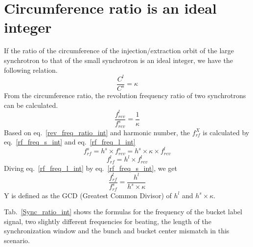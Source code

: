 %
%
% 
%
\section{ Circumference ratio is an ideal integer}

If the ratio of the circumference of the injection/extraction orbit of the large synchrotron to that of the small synchrotron is an ideal integer, we have the following relation. 
\begin{equation}
\frac{C^l}{C^s}=\kappa \label{circumference_ratio_int}
\end{equation}
From the circumference ratio, the revolution frequency ratio of two synchrotrons can be calculated.
\begin{equation}
\frac{f_{rev}^{l}}{f_{rev}^{s}}=\frac{1}{\kappa} \label{rev_freq_ratio_int}
\end{equation}
Based on eq.~\ref{rev_freq_ratio_int} and harmonic number, the $f_{rf}^{X}$ is calculated by eq.~\ref{rf_freq_s_int} and eq.~\ref{rf_freq_l_int}
\begin{equation} 
f_{rf}^{s}= h^s \times f_{rev}^{s}=h^s \times \kappa \times f_{rev}^{l} \label{rf_freq_s_int}
\end{equation}
\begin{equation} 
f_{rf}^{l}= h^l \times f_{rev}^{l} \label{rf_freq_l_int}
\end{equation}
Diving eq.~\ref{rf_freq_l_int} by eq.~\ref{rf_freq_s_int}, we get
\begin{equation} 
\frac{f_{rf}^{l}}{f_{rf}^{s}}= \frac{h^l}{h^s \times \kappa} \label{rf_freq_ratio}
\end{equation}
Y is defined as the \gls{GCD} (Greatest Common Divisor) of $h^l$ and $h^s \times \kappa$.

Tab.~\ref{Sync_ratio_int} shows the formulas for the frequency of the bucket label signal, two slightly different frequencies for beating, the length of the synchronization window and the bunch and bucket center mismatch in this scenario.

